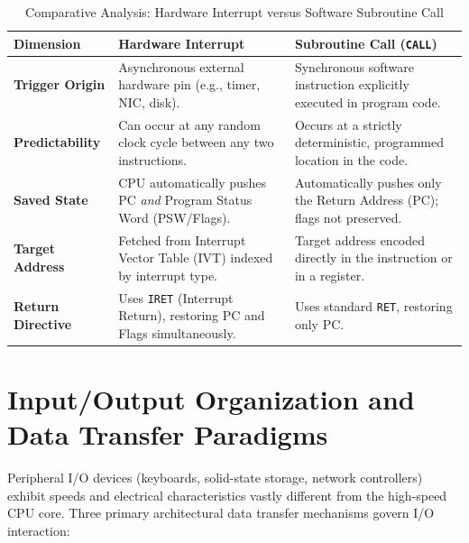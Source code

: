 \begin{table}[htbp]
\centering
\small
\caption{Comparative Analysis: Hardware Interrupt versus Software Subroutine Call}
\label{tab:interrupt_vs_call}
\begin{tabularx}{\textwidth}{l X X}
\toprule
\textbf{Dimension} & \textbf{Hardware Interrupt} & \textbf{Subroutine Call (\texttt{CALL})} \\
\midrule
\textbf{Trigger Origin} & Asynchronous external hardware pin (e.g., timer, NIC, disk). & Synchronous software instruction explicitly executed in program code. \\
\textbf{Predictability} & Can occur at any random clock cycle between any two instructions. & Occurs at a strictly deterministic, programmed location in the code. \\
\textbf{Saved State} & CPU automatically pushes PC \textit{and} Program Status Word (PSW/Flags). & Automatically pushes only the Return Address (PC); flags not preserved. \\
\textbf{Target Address} & Fetched from Interrupt Vector Table (IVT) indexed by interrupt type. & Target address encoded directly in the instruction or in a register. \\
\textbf{Return Directive} & Uses \texttt{IRET} (Interrupt Return), restoring PC and Flags simultaneously. & Uses standard \texttt{RET}, restoring only PC. \\
\bottomrule
\end{tabularx}
\end{table}


\section{Input/Output Organization and Data Transfer Paradigms}
\label{sec:io_organization}

Peripheral I/O devices (keyboards, solid-state storage, network controllers) exhibit speeds and electrical characteristics vastly different from the high-speed CPU core. Three primary architectural data transfer mechanisms govern I/O interaction:

